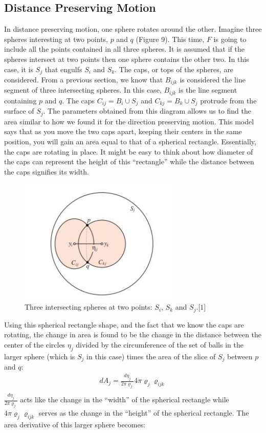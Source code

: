 \documentclass{article}
\begin{document}
\subsection{Distance Preserving Motion}
In distance preserving motion, one sphere rotates around the other. Imagine three spheres interesting at two points, $p$ and $q$ (Figure 9). This time, $F$ is going to include all the points contained in all three spheres. It is assumed that if the spheres intersect at two points then one sphere contains the other two. In this case, it is $S_j$ that engulfs $S_i$ and $S_k$. The caps, or tops of the spheres, are considered. From a previous section, we know that $B_{ijk}$ is considered the line segment of three intersecting spheres. In this case, $B_{ijk}$ is the line segment containing $p$ and $q$. The caps $C_{ij} = B_i \cup S_j$ and $C_{kj} = B_k \cup S_j$ protrude from the surface of $S_j$. The parameters obtained from this diagram allows us to find the area similar to how we found it for the direction preserving motion. This model says that as you move the two caps apart, keeping their centers in the same position, you will gain an area equal to that of a spherical rectangle. Essentially, the caps are rotating in place. It might be easy to think about how diameter of the caps can represent the height of this “rectangle” while the distance between the caps signifies its width.
\begin{figure}[h!]
\caption{Three intersecting spheres at two points: $S_i$, $S_k$ and $S_j.\lbrack1\rbrack$}
\centerline{\includegraphics[width=3in]{Figure7}}
\end{figure}

Using this spherical rectangle shape, and the fact that we know the caps are rotating, the change in area is found to be the change in the distance between the center of the circles $\eta_j$ divided by the circumference of the set of balls in the larger sphere (which is $S_j$ in this case) times the area of the slice of $S_j$ between $p$ and $q$: 
\begin{align*}
dA_j = \frac{d\eta_j}{2\pi\varrho_j}4\pi\varrho_j\varrho_{ijk}\\
\end{align*}
$\frac{d\eta_j}{2\pi\varrho_j}$ acts like the change in the “width” of the spherical rectangle while $4\pi\varrho_j\varrho_{ijk}$ serves as the change in the “height” of the spherical rectangle. The area derivative of this larger sphere becomes:
\end{document}
